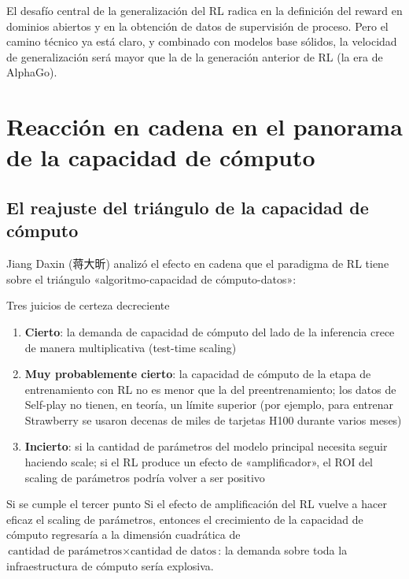 \documentclass[a4paper]{article}
\begin{document}
El desafío central de la generalización del RL radica en la definición del reward en dominios abiertos y en la obtención de datos de supervisión de proceso. Pero el camino técnico ya está claro, y combinado con modelos base sólidos, la velocidad de generalización será mayor que la de la generación anterior de RL (la era de AlphaGo).

\section{Reacción en cadena en el panorama de la capacidad de cómputo}

\subsection{El reajuste del triángulo de la capacidad de cómputo}

Jiang Daxin (蒋大昕) analizó el efecto en cadena que el paradigma de RL tiene sobre el triángulo «algoritmo-capacidad de cómputo-datos»:

\begin{importantbox}{Tres juicios de certeza decreciente}
\begin{enumerate}
\item \textbf{Cierto}: la demanda de capacidad de cómputo del lado de la inferencia crece de manera multiplicativa (test-time scaling)
\item \textbf{Muy probablemente cierto}: la capacidad de cómputo de la etapa de entrenamiento con RL no es menor que la del preentrenamiento; los datos de Self-play no tienen, en teoría, un límite superior (por ejemplo, para entrenar Strawberry se usaron decenas de miles de tarjetas H100 durante varios meses)
\item \textbf{Incierto}: si la cantidad de parámetros del modelo principal necesita seguir haciendo scale; si el RL produce un efecto de «amplificador», el ROI del scaling de parámetros podría volver a ser positivo
\end{enumerate}
\end{importantbox}

\begin{warningbox}{Si se cumple el tercer punto}
Si el efecto de amplificación del RL vuelve a hacer eficaz el scaling de parámetros, entonces el crecimiento de la capacidad de cómputo regresaría a la dimensión cuadrática de $\text{cantidad de parámetros} \times \text{cantidad de datos}$: la demanda sobre toda la infraestructura de cómputo sería explosiva.
\end{warningbox}
\end{document}
